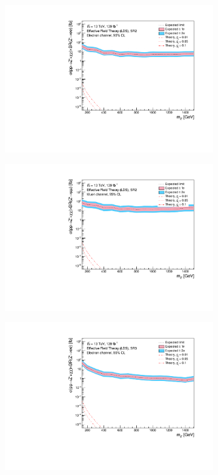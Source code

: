\documentclass[12pt, a4paper]{book}
\begin{document}
\begin{figure}[!ht]
\begin{subfigure}[b]{0.49\textwidth}
      \includegraphics[width=1\textwidth]{Limits/Model_independent/100-150/EFT_LDS/mass_exclusion_ee.pdf}
   \end{subfigure}
   \hfill
   \begin{subfigure}[b]{0.49\textwidth}
      \centering
      \includegraphics[width=1\textwidth]{Limits/Model_independent/100-150/EFT_LDS/mass_exclusion_uu.pdf}
   \end{subfigure}
   \hfill
	\begin{subfigure}[b]{0.49\textwidth}
      \centering
      \includegraphics[width=1\textwidth]{Limits/Model_independent/150/EFT_LDS/mass_exclusion_ee.pdf}

\end{subfigure}
\end{figure}
\end{document}
